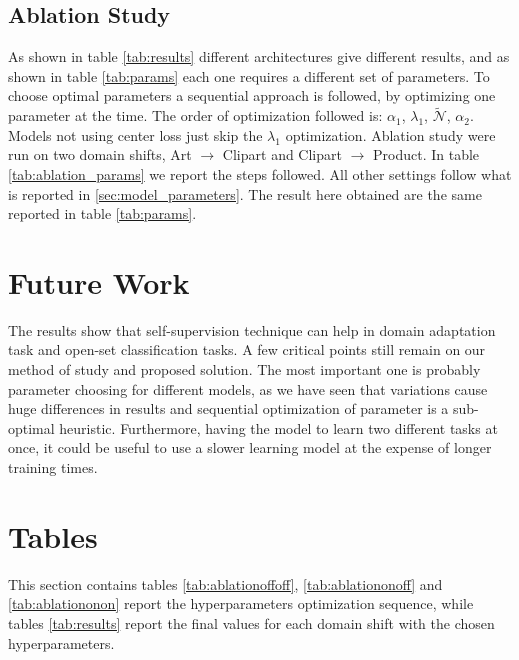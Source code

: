 \documentclass[10pt,twocolumn,letterpaper]{article}
\begin{document}
\subsection{Ablation Study}
\label{sec:ablation_study}
As shown in table \ref{tab:results} different architectures give different results, 
and as shown in table \ref{tab:params} each one requires a different set of parameters.
To choose optimal parameters a sequential approach is followed, 
by optimizing one parameter at the time.
The order of optimization followed is: 
$\alpha_1$, $\lambda_1$, $\mathcal{\tilde N}$, $\alpha_2$.
Models not using center loss just skip the $\lambda_1$ optimization.
Ablation study were run on two domain shifts, 
Art $\to$ Clipart and Clipart $\to$ Product.
In table \ref{tab:ablation_params} we report the steps followed.
All other settings follow what is reported in \ref{sec:model_parameters}.
The result here obtained are the same reported in table \ref{tab:params}.

\section{Future Work}

The results show that self-supervision technique can help in domain adaptation task and open-set classification tasks.
A few critical points still remain on our method of study and proposed solution.
The most important one is probably parameter choosing for different models, as we have seen that variations cause huge differences in results and sequential optimization of parameter is a sub-optimal heuristic.
Furthermore, having the model to learn two different tasks at once, it could be useful to use a slower learning model at the expense of longer training times.

{\small


}

\newpage
\appendix
\section{Tables}
\label{sec:tables}

This section contains tables \ref{tab:ablationoffoff}, \ref{tab:ablationonoff} and \ref{tab:ablationonon} report the hyperparameters optimization sequence, while tables \ref{tab:results} report the final values for each domain shift with the chosen hyperparameters.
\end{document}
